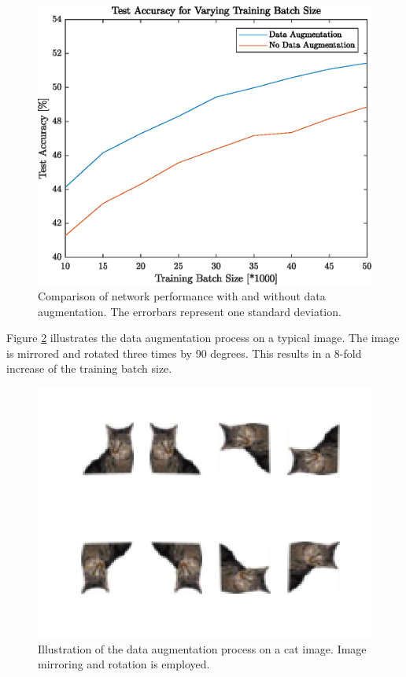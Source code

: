    	\begin{figure}[h!]
		\centering
   	  	\includegraphics{images/dataAugmentation}
   	  	\caption{Comparison of network performance with and without data augmentation. The errorbars represent one standard deviation.}
   	  	\label{fig:dataAugmentation}
   	\end{figure}

Figure \ref{fig:dataAugDemo} illustrates the data augmentation process on a typical image. The image is mirrored and rotated three times by 90 degrees. This results in a 8-fold increase of the training batch size.

   	\begin{figure}[h!]
   		\centering
   		\includegraphics{images/DataAugDemo.png}
   		\caption{Illustration of the data augmentation process on a cat image. Image mirroring and rotation is employed.}
   		\label{fig:dataAugDemo}
   	\end{figure}

